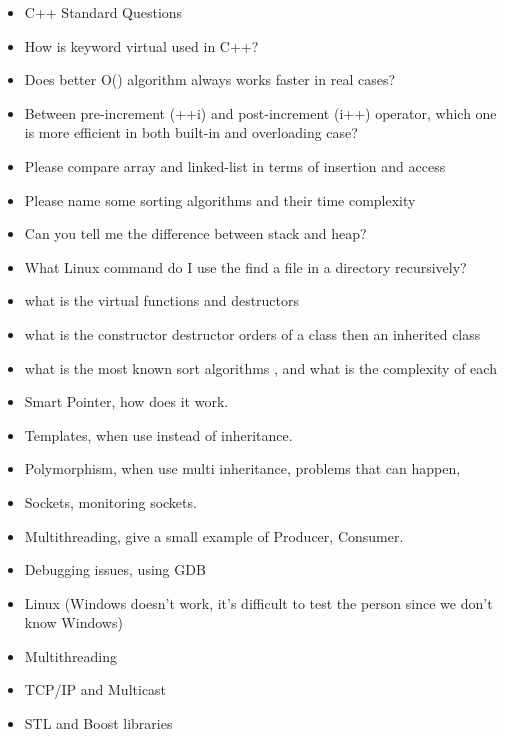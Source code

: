 \documentclass[a4paper, 10pt]{article}
\begin{document}
\begin{itemize}
    \item C++ Standard Questions
    \item How is keyword virtual used in C++?
    \item Does better O() algorithm always works faster in real cases?
    \item Between pre-increment (++i)  and post-increment (i++) operator, which one is more efficient in both built-in and overloading case?
    \item Please compare array and linked-list in terms of insertion and access
    \item Please name some sorting algorithms and their time complexity
    \item Can you tell me the difference between stack and heap?
    \item What Linux command do I use the find a file in a directory recursively?
    \item what is the virtual functions and destructors
    \item what is the constructor destructor orders of a class then an inherited class
    \item what is the most known sort algorithms , and what is the complexity of each
    \item Smart Pointer, how does it work.
    \item Templates, when use instead of inheritance.
    \item Polymorphism, when use multi inheritance, problems that can happen,
    \item Sockets, monitoring sockets.
    \item Multithreading, give a small example of Producer, Consumer.
    \item Debugging issues, using GDB
    \item Linux (Windows doesn’t work, it’s difficult to test the person since we don’t know Windows)
    \item Multithreading
    \item TCP/IP and Multicast
    \item STL and Boost libraries
\end{itemize}
\end{document}
